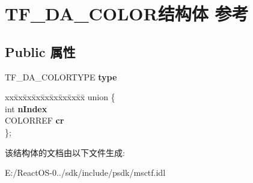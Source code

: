 \hypertarget{struct_t_f___d_a___c_o_l_o_r}{}\section{T\+F\+\_\+\+D\+A\+\_\+\+C\+O\+L\+O\+R结构体 参考}
\label{struct_t_f___d_a___c_o_l_o_r}
\subsection*{Public 属性}
\begin{DoxyCompactItemize}
\item 
\mbox{\label{struct_t_f___d_a___c_o_l_o_r_a4a1cf5774ee13fafa201794ce0ebf058}} 
T\+F\+\_\+\+D\+A\+\_\+\+C\+O\+L\+O\+R\+T\+Y\+PE {\bfseries type}
\item 
\mbox{\label{struct_t_f___d_a___c_o_l_o_r_a0cb0218d26542c111b438b2f8fc3e65d}} 
\begin{tabbing}
xx\=xx\=xx\=xx\=xx\=xx\=xx\=xx\=xx\=\kill
union \{\\
\>int {\bfseries nIndex}\\
\>COLORREF {\bfseries cr}\\
\}; \\

\end{tabbing}\end{DoxyCompactItemize}


该结构体的文档由以下文件生成\+:\begin{DoxyCompactItemize}
\item 
E\+:/\+React\+O\+S-\/0../sdk/include/psdk/msctf.\+idl\end{DoxyCompactItemize}
